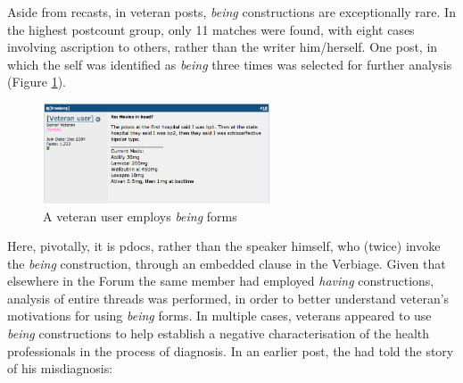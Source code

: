 Aside from recasts, in veteran \glspl{post}, \emph{being} constructions are exceptionally rare. In the highest postcount group, only 11 matches were found, with eight cases involving ascription to others, rather than the writer him\slash herself. One post, in which the self was identified as \emph{being}  three times was selected for further analysis (Figure \ref{fig:firstsaid}).
    

\begin{figure}[H]
  \begin{center}
  \includegraphics[width=0.6\textwidth]{../images/firstsaid.png}
  \end{center}
  \caption{A veteran user employs \emph{being} forms}
  \label{fig:firstsaid}
  \end{figure}
%
\noindent Here, pivotally, it is pdocs, rather than the speaker himself, who (twice) invoke the \emph{being} construction, through an embedded clause in the Verbiage. Given that elsewhere in the \gls{Forum} the same member had employed \emph{having} constructions, analysis of entire threads was performed, in order to better understand veteran's motivations for using \emph{being} forms. In multiple cases, veterans appeared to use \emph{being} constructions to help establish a negative characterisation of the health professionals in the process of diagnosis. In an earlier \gls{post}, the  had told the story of his misdiagnosis:
    
    
